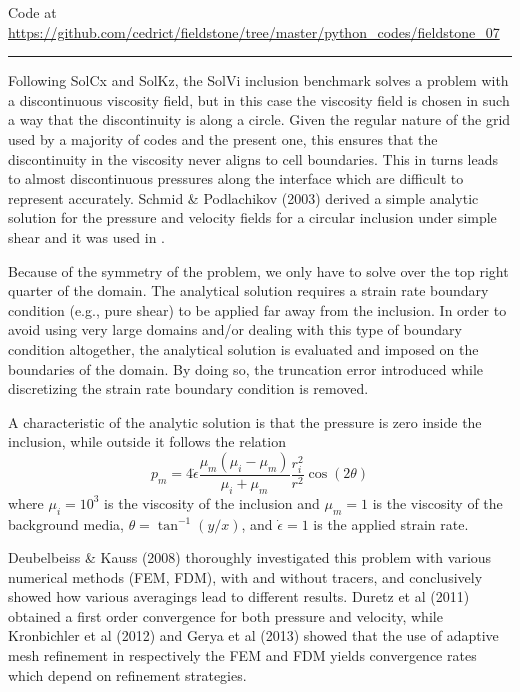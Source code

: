 

\begin{center}
Code at \url{https://github.com/cedrict/fieldstone/tree/master/python_codes/fieldstone_07}
\end{center}

\par\noindent\rule{\textwidth}{0.4pt}

Following SolCx and SolKz, the SolVi inclusion benchmark solves 
a problem with a discontinuous viscosity field, but in this case 
the viscosity field is chosen in such a way that the discontinuity 
is along a circle. Given the regular nature of the grid used by a majority of codes and the present one, 
this ensures that the discontinuity in the viscosity never aligns to cell boundaries.
This in turns leads to almost discontinuous pressures along the interface which are difficult to represent accurately.
Schmid \& Podlachikov (2003) \cite{scpo03} derived a simple analytic solution for the pressure and 
velocity fields for a circular 
inclusion under simple shear and it was used in \cite{deka08,sunh10,dumg11,krhb12,gemd13}.

Because of the symmetry of the problem, we only have to solve over the top right quarter of the domain.
The analytical solution requires a strain rate boundary condition (e.g., pure shear) to be applied far away 
from the inclusion. In order to avoid using very large domains and/or dealing with this type of boundary condition 
altogether, the analytical solution is evaluated and imposed on the boundaries of the domain. 
By doing so, the truncation error introduced while discretizing the strain rate boundary condition is removed.

A characteristic of the analytic solution is that the pressure is zero inside the inclusion, while outside it follows the relation
\begin{equation}
p_m = 4 \dot{\epsilon}
\frac{\mu_m(\mu_i-\mu_m)}{\mu_i+\mu_m}
\frac{r_i^2}{r^2} \cos(2\theta)
\end{equation}
where $\mu_i = 10^3$ is the viscosity of the inclusion and $\mu_m = 1$ is the viscosity of the background media, $\theta=\tan^{-1}(y/x)$,
and $\dot{\epsilon}=1$ is the applied strain rate.

Deubelbeiss \& Kauss (2008) \cite{deka08} thoroughly investigated this problem with various 
numerical methods (FEM, FDM), with and without tracers, 
and conclusively showed how various averagings lead to different results. 
Duretz et al (2011) \cite{dumg11} obtained a first order convergence for both pressure and velocity, 
while Kronbichler et al (2012) \cite{krhb12}
and Gerya et al (2013) \cite{gemd13} showed that the use of adaptive mesh refinement in respectively the FEM and FDM 
yields convergence rates which depend on refinement strategies. 

